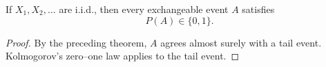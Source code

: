 \begin{cor}
If $X_1,X_2,\ldots$ are i.i.d., then every exchangeable event $A$ satisfies
\[
P(A)\in\{0,1\}.
\]
\end{cor}

\begin{proof}
By the preceding theorem, $A$ agrees almost surely with a tail event.
Kolmogorov's zero--one law applies to the tail event.
\end{proof}

